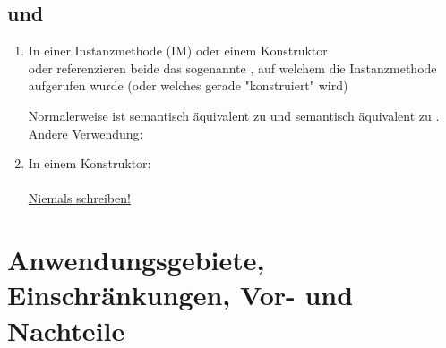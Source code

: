 \subsection{ und }
\begin{enumerate}[label=(\roman*)]
	\item In einer Instanzmethode (IM) oder einem Konstruktor\\
	 oder  referenzieren beide das sogenannte , auf welchem die Instanzmethode aufgerufen wurde (oder welches gerade "konstruiert" wird)\\

\begin{figure}[H] %
	\begin{center}
		
	\end{center}
\end{figure}

Normalerweise ist  semantisch äquivalent zu  und  semantisch äquivalent zu .
\newpage %
\\
Andere Verwendung:\\
	\item In einem Konstruktor:\\
	\\
	\href{https://stackoverflow.com/questions/586363/why-is-super-super-method-not-allowed-in-java}{Niemals  schreiben!}
\end{enumerate}


\section{Anwendungsgebiete, Einschränkungen, Vor- und Nachteile}



